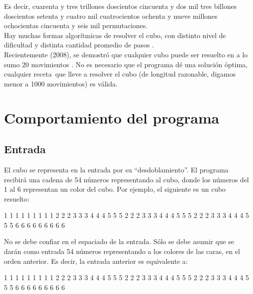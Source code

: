 \documentclass[11pt,a4paper]{article}
\begin{document}
Es decir, cuarenta y tres trillones doscientos cincuenta y dos mil tres billones doscientos setenta y cuatro mil cuatrocientos ochenta y nueve millones ochocientas cincuenta y seis mil permutaciones.\\

Hay muchas formas algorítmicas de resolver el cubo, con distinto nivel de dificultad y distinta cantidad promedio de pasos \cite{solve}\cite{johnbent}. \\

Recientemente (2008), se demostró que cualquier cubo puede ser resuelto en a lo sumo 20 movimientos \cite{movs}. No es necesario que el programa dé una solución óptima, cualquier receta\footnotemark \, que lleve a resolver el cubo (de longitud razonable, digamos menor a 1000 movimientos) es válida.


\section{Comportamiento del programa}

\subsection{Entrada}
El cubo se representa en la entrada por su ``desdoblamiento''. El programa recibirá una cadena de 54 números representando al cubo, donde los números del 1 al 6 representan un color del cubo. Por ejemplo, el siguiente es un cubo resuelto: \\
\begin{center}
\begin{verbbox}
      1 1 1
      1 1 1
      1 1 1
2 2 2 3 3 3 4 4 4 5 5 5
2 2 2 3 3 3 4 4 4 5 5 5
2 2 2 3 3 3 4 4 4 5 5 5
      6 6 6
      6 6 6
      6 6 6
\end{verbbox}

\theverbbox
\end{center}

No se debe confiar en el espaciado de la entrada. Sólo se debe asumir que se darán como entrada 54 números representando a los colores de las caras, en el orden anterior. Es decir, la entrada anterior es equivalente a:

\begin{center}
\begin{verbbox}
1 1 1 1 1 1 1 1 1 2 2 2 3 3 3 4 4 4 5 5 5 2 2 2 3 3 3
4 4 4 5 5 5 2 2 2 3 3 3 4 4 4 5 5 5 6 6 6 6 6 6 6 6 6
\end{verbbox}

\theverbbox
\end{center}
\end{document}
